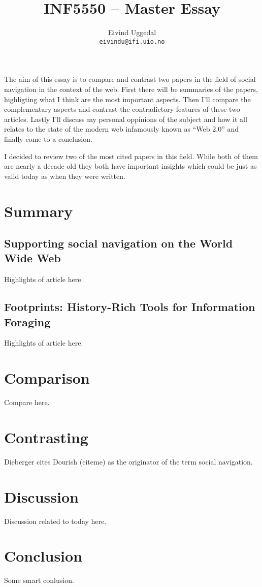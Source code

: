 \documentclass[12pt,a4paper]{article}
\author{Eivind Uggedal\\
  \texttt{eivindu@ifi.uio.no}}
\title{INF5550 -- Master Essay}
\begin{document}
\maketitle{}

The aim of this essay is to compare and contrast two papers in the field of
social navigation in the context of the web. First there will be summaries
of the papers, highligting what I think are the most important aspects.
Then I'll compare the complementary aspects and contrast the contradictory
features of these two articles. Lastly I'll discuss my personal
oppinions of the subject and how it all relates to the state of the modern web
infamously known as ``Web 2.0'' and finally come to a conclusion.

I decided to review two of the most cited papers in this field. While both of
them are nearly a decade old they both have important insights which could be
just as valid today as when they were written.

\cite{wexelblat99}
\cite{dieberger97}

\section{Summary}

\subsection{Supporting social navigation on the World Wide Web}

Highlights of article here.

\subsection{Footprints: History-Rich Tools for Information Foraging}

Highlights of article here.

\section{Comparison}

Compare here.

\section{Contrasting}

Dieberger cites Dourish (citeme) as the originator of the term social
navigation.

\section{Discussion}

Discussion related to today here.

\section{Conclusion}

Some smart conlusion.

\section{}




\end{document}
